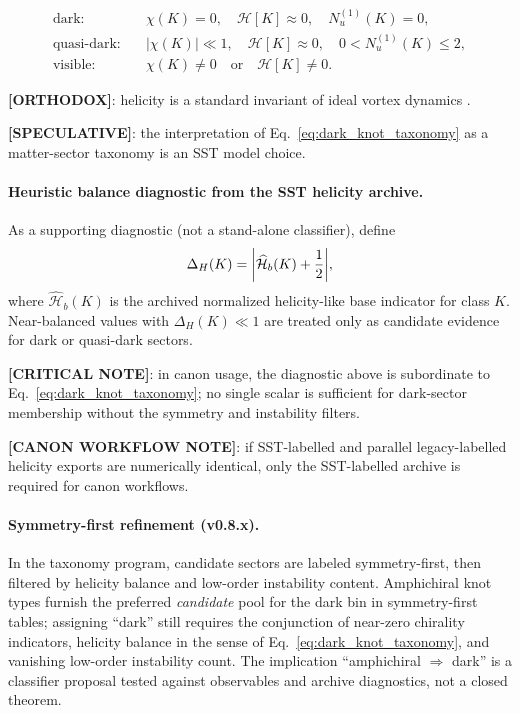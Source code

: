 \documentclass[11pt]{article}
\theoremstyle{definition}
\theoremstyle{plain}
\theoremstyle{remark}
\begin{document}
    \begin{align}
        \text{dark:}&\quad \chi(K)=0,\quad \mathcal{H}[K]\approx 0,\quad N_u^{(1)}(K)=0, \\
        \text{quasi-dark:}&\quad |\chi(K)|\ll 1,\quad \mathcal{H}[K]\approx 0,\quad 0 < N_u^{(1)}(K)\le 2, \\
        \text{visible:}&\quad \chi(K)\neq 0 \quad \text{or}\quad \mathcal{H}[K]\neq 0.
        \label{eq:dark_knot_taxonomy}
    \end{align}

    \textbf{[ORTHODOX]}: helicity is a standard invariant of ideal vortex dynamics \cite{Moffatt1969,Batchelor1967}.

    \textbf{[SPECULATIVE]}: the interpretation of Eq.~\eqref{eq:dark_knot_taxonomy} as a matter-sector taxonomy is an SST model choice.

    \paragraph{Heuristic balance diagnostic from the SST helicity archive.}
    As a supporting diagnostic (not a stand-alone classifier), define
    \begin{align}
        \Delta_H(K)=\abs{\widehat{\mathcal{H}}_{b}(K)+\frac{1}{2}},
    \end{align}
    where $\widehat{\mathcal{H}}_{b}(K)$ is the archived normalized helicity-like base indicator for class $K$.
    Near-balanced values with $\Delta_H(K)\ll 1$ are treated only as candidate evidence for dark or quasi-dark sectors.

    \textbf{[CRITICAL NOTE]}: in canon usage, the diagnostic above is subordinate to Eq.~\eqref{eq:dark_knot_taxonomy}; no single scalar is sufficient for dark-sector membership without the symmetry and instability filters.

    \textbf{[CANON WORKFLOW NOTE]}: if SST-labelled and parallel legacy-labelled helicity exports are numerically identical, only the SST-labelled archive is required for canon workflows.

    \paragraph{Symmetry-first refinement (v0.8.x).}
        In the taxonomy program, candidate sectors are labeled symmetry-first, then filtered by helicity balance and low-order instability content.
        Amphichiral knot types furnish the preferred \emph{candidate} pool for the dark bin in symmetry-first tables; assigning ``dark'' still requires the conjunction of near-zero chirality indicators, helicity balance in the sense of Eq.~\eqref{eq:dark_knot_taxonomy}, and vanishing low-order instability count.
        The implication ``amphichiral $\Rightarrow$ dark'' is a classifier proposal tested against observables and archive diagnostics, not a closed theorem.
\end{document}

